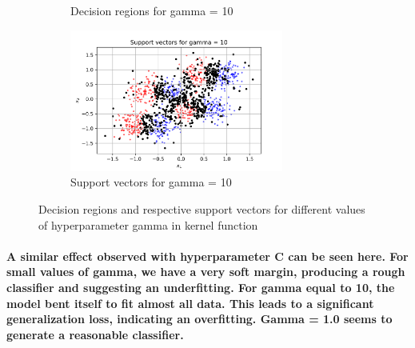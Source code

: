 \documentclass[a4paper]{article}    %
\begin{document}
\begin{figure}[H]
\begin{subfigure}{0.45\textwidth}
        \caption{Decision regions for gamma = 10}
        \label{fig:svm-decision_region_gamma_10}
    \end{subfigure}
    \hfill
    \begin{subfigure}{0.45\textwidth}
        \centering
        \includegraphics[width=7cm]{support_vectors_gamma_10}
        \caption{Support vectors for gamma = 10}
        \label{fig:svm-support_vectors_gamma_10}
    \end{subfigure}
    \caption{Decision regions and respective support vectors for different values of hyperparameter gamma in kernel function}
    \label{fig:svm-decision_regions_support_vectos_gamma}
\end{figure}

\paragraph{A similar effect observed with hyperparameter C can be seen here. For small values of gamma, we have a very soft margin, producing a rough classifier and suggesting an underfitting. For gamma equal to 10, the model bent itself to fit almost all data. This leads to a significant generalization loss, indicating an overfitting. Gamma = 1.0 seems to generate a reasonable classifier.}

\end{document}
